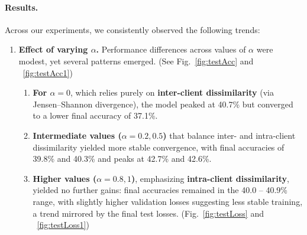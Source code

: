 \documentclass[10pt,twocolumn,letterpaper]{article}
\begin{document}
\paragraph{Results.}
Across our experiments, we consistently observed the following trends:
\begin{enumerate}    
    \item \textbf{Effect of varying \boldmath$\alpha$.}  
    Performance differences across values of $\alpha$ were modest, yet several patterns emerged. (See Fig.~\ref{fig:testAcc} and ~\ref{fig:testAcc1})  
    \begin{enumerate} 
    \item \textbf{For \boldmath$\alpha=0$}, which relies purely on \textbf{inter-client dissimilarity} (via Jensen–Shannon divergence), the model peaked at 40.7\% but converged to a lower final accuracy of 37.1\%.
    \item \textbf{Intermediate values (\boldmath$\alpha=0.2,0.5$)} that balance inter- and intra-client dissimilarity yielded more stable convergence, with final accuracies of 39.8\% and 40.3\% and peaks at 42.7\% and 42.6\%.  
    \item \textbf{Higher values (\boldmath$\alpha=0.8,1$)}, emphasizing 
    \textbf{intra-client dissimilarity}, yielded no further gains: final accuracies remained in the 40.0 -- 40.9\% range, with slightly higher validation losses suggesting less stable training, a trend mirrored by the final test losses. (Fig.~\ref{fig:testLoss} and ~\ref{fig:testLoss1})
    \end{enumerate} 
    

\end{enumerate}
\end{document}
